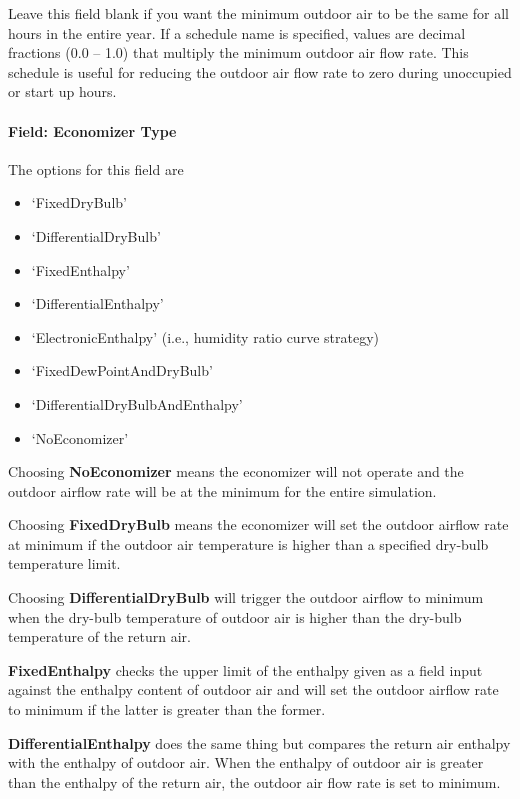 Leave this field blank if you want the minimum outdoor air to be the same for all hours in the entire year. If a schedule name is specified, values are decimal fractions (0.0 -- 1.0) that multiply the minimum outdoor air flow rate. This schedule is useful for reducing the outdoor air flow rate to zero during unoccupied or start up hours.

\paragraph{Field: Economizer Type}\label{field-economizer-type-4}

The options for this field are

\begin{itemize}
\item
  `FixedDryBulb'
\item
  `DifferentialDryBulb'
\item
  `FixedEnthalpy'
\item
  `DifferentialEnthalpy'
\item
  `ElectronicEnthalpy' (i.e., humidity ratio curve strategy)
\item
  `FixedDewPointAndDryBulb'
\item
  `DifferentialDryBulbAndEnthalpy'
\item
  `NoEconomizer'
\end{itemize}

Choosing \textbf{NoEconomizer} means the economizer will not operate and the outdoor airflow rate will be at the minimum for the entire simulation.

Choosing \textbf{FixedDryBulb} means the economizer will set the outdoor airflow rate at minimum if the outdoor air temperature is higher than a specified dry-bulb temperature limit.

Choosing \textbf{DifferentialDryBulb} will trigger the outdoor airflow to minimum when the dry-bulb temperature of outdoor air is higher than the dry-bulb temperature of the return air.

\textbf{FixedEnthalpy} checks the upper limit of the enthalpy given as a field input against the enthalpy content of outdoor air and will set the outdoor airflow rate to minimum if the latter is greater than the former.

\textbf{DifferentialEnthalpy} does the same thing but compares the return air enthalpy with the enthalpy of outdoor air. When the enthalpy of outdoor air is greater than the enthalpy of the return air, the outdoor air flow rate is set to minimum.

